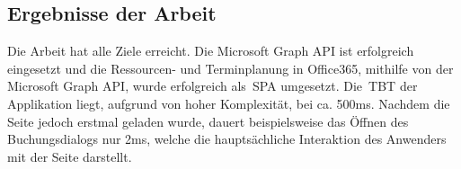    \subsection{Ergebnisse der Arbeit}\label{subsec:ergebnisse-der-arbeit}
Die Arbeit hat alle Ziele erreicht.
    Die Microsoft Graph API ist erfolgreich eingesetzt und die Ressourcen- und Terminplanung in Office365, mithilfe von der Microsoft Graph API, wurde erfolgreich als~\gls{SPA} umgesetzt.
Die~\gls{TBT} der Applikation liegt, aufgrund von hoher Komplexität, bei ca. 500ms.
    Nachdem die Seite jedoch erstmal geladen wurde, dauert beispielsweise das Öffnen des Buchungsdialogs nur 2ms, welche die hauptsächliche Interaktion des Anwenders mit der Seite darstellt.
    \newline
\newpage

